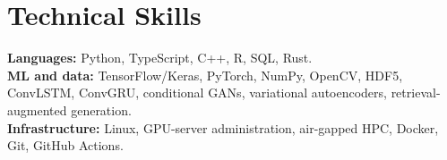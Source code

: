 \section{Technical Skills}
\textbf{Languages:} Python, TypeScript, C++, R, SQL, Rust.\\
\textbf{ML and data:} TensorFlow/Keras, PyTorch, NumPy, OpenCV, HDF5, ConvLSTM, ConvGRU, conditional GANs, variational autoencoders, retrieval-augmented generation.\\
\textbf{Infrastructure:} Linux, GPU-server administration, air-gapped HPC, Docker, Git, GitHub Actions.

